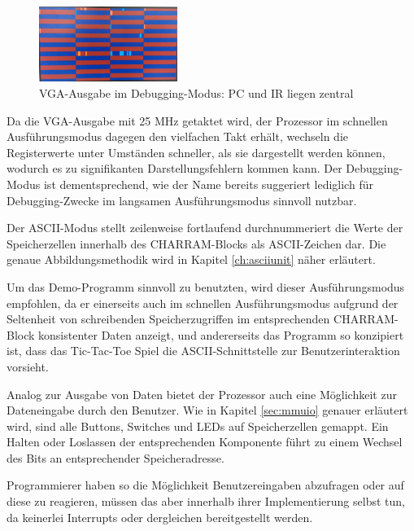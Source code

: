 \begin{figure}[H]
	\centering
	\label{fig:debuggingui}
		\includegraphics[width=0.4\textwidth]{debugui.png}
	\caption[VGA-Ausgabe im Debugging-Modus]{VGA-Ausgabe im Debugging-Modus: PC und IR liegen zentral}
\end{figure}

Da die VGA-Ausgabe mit 25 MHz getaktet wird, der Prozessor im schnellen Ausf\"uhrungsmodus dagegen den vielfachen Takt erh\"alt, wechseln die Registerwerte unter Umst\"anden schneller, als sie dargestellt werden k\"onnen, wodurch es zu signifikanten Darstellungsfehlern kommen kann. Der Debugging-Modus ist dementsprechend, wie der Name bereits suggeriert lediglich f\"ur Debugging-Zwecke im langsamen Ausf\"uhrungsmodus sinnvoll nutzbar.

Der ASCII-Modus stellt zeilenweise fortlaufend durchnummeriert die Werte der Speicherzellen innerhalb des CHAR\-RAM-Blocks als ASCII-Zeichen dar. Die genaue Abbildungsmethodik wird in Kapitel \ref{ch:asciiunit} n\"aher erl\"autert.

Um das Demo-Programm sinnvoll zu benutzten, wird dieser Ausf\"uhrungsmodus empfohlen, da er einerseits auch im schnellen Ausf\"uhrungsmodus aufgrund der Seltenheit von schreibenden Speicherzugriffen im entsprechenden CHAR\-RAM-Block konsistenter Daten anzeigt, und andererseits das Programm so konzipiert ist, dass das Tic-Tac-Toe Spiel die ASCII-Schnittstelle zur Benutzerinteraktion vorsieht.


Analog zur Ausgabe von Daten bietet der Prozessor auch eine M\"oglichkeit zur Dateneingabe durch den Benutzer. Wie in Kapitel \ref{sec:mmuio} genauer erl\"autert wird, sind alle Buttons, Switches und LEDs auf Speicherzellen gemappt. Ein Halten oder Loslassen der entsprechenden Komponente f\"uhrt zu einem Wechsel des Bits an entsprechender Speicheradresse.

Programmierer haben so die M\"oglichkeit Benutzereingaben abzufragen oder auf diese zu reagieren, m\"ussen das aber innerhalb ihrer Implementierung selbst tun, da keinerlei Interrupts oder dergleichen bereitgestellt werden.

\newpage

